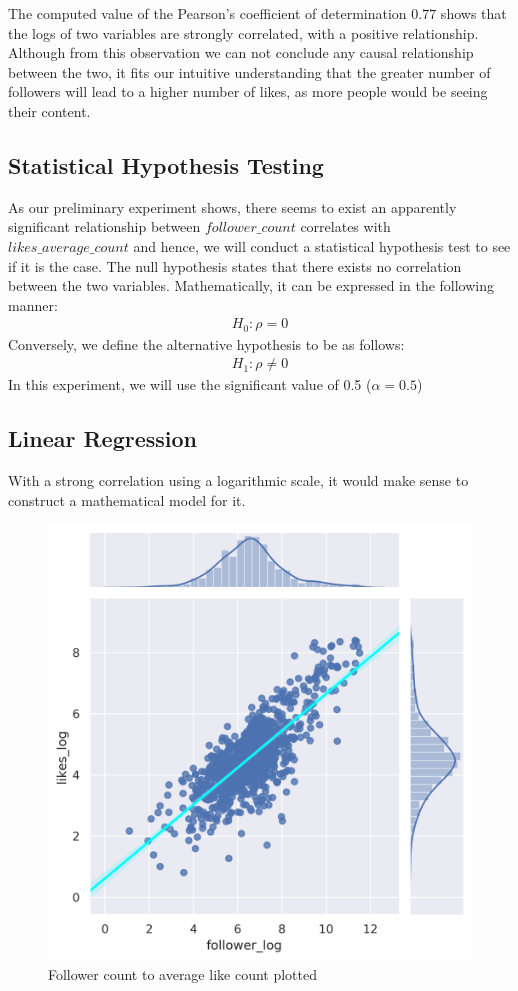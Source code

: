\documentclass[11pt]{article}
\begin{document}
The computed value of the Pearson's coefficient of determination $0.77$ shows that the logs of two variables are strongly correlated, with a positive relationship. Although from this observation we can not conclude any causal relationship between the two, it fits our intuitive understanding that the greater number of followers will lead to a higher number of likes, as more people would be seeing their content.
%
\subsection{Statistical Hypothesis Testing}
As our preliminary experiment shows, there seems to exist an apparently significant relationship between  $follower\_count$ correlates with $likes\_average\_count$ and hence, we will conduct a statistical hypothesis test to see if it is the case.
The null hypothesis states that there exists no correlation between the two variables. Mathematically, it can be expressed in the following manner:
\begin{align}
H _ { 0 } : \rho = 0
\end{align}
Conversely, we define the alternative hypothesis to be as follows:
\begin{align}
H _ { 1 } : \rho \neq 0
\end{align}
In this experiment, we will use the significant value of 0.5 ($\alpha=0.5$)
\subsection{Linear Regression}

With a strong correlation using a logarithmic scale, it would make sense to construct a mathematical model for it.  

\begin{figure}[H]
  \center
  \includegraphics[width=0.75\linewidth]{images/regression_graph.png}
  \caption{Follower count to average like count plotted}
  \label{fig:linear_regression}
\end{figure}
\end{document}
